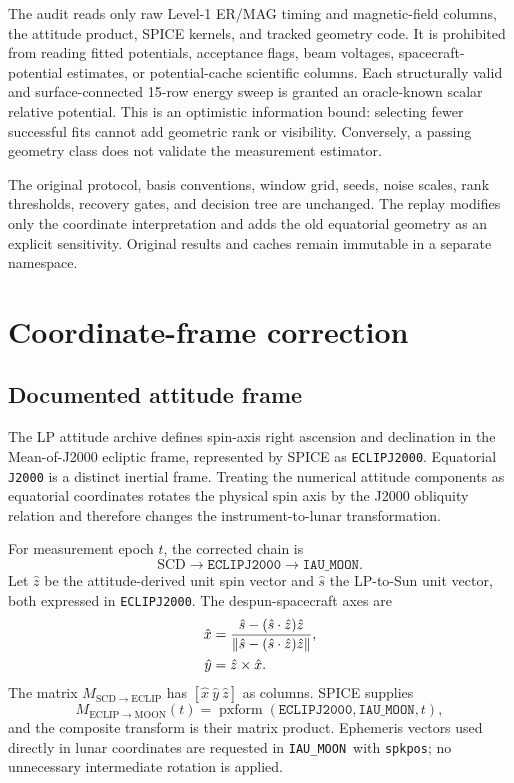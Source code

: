 \documentclass[11pt]{article}
\newcommand{\ECLIP}{\texttt{ECLIPJ2000}}
\newcommand{\MOON}{\texttt{IAU\_MOON}}
\begin{document}
The audit reads only raw Level-1 ER/MAG timing and magnetic-field columns, the
attitude product, SPICE kernels, and tracked geometry code.  It is prohibited
from reading fitted potentials, acceptance flags, beam voltages,
spacecraft-potential estimates, or potential-cache scientific columns.  Each
structurally valid and surface-connected 15-row energy sweep is granted an
oracle-known scalar relative potential.  This is an optimistic information
bound: selecting fewer successful fits cannot add geometric rank or
visibility.  Conversely, a passing geometry class does not validate the
measurement estimator.

The original protocol, basis conventions, window grid, seeds, noise scales,
rank thresholds, recovery gates, and decision tree are unchanged.  The replay
modifies only the coordinate interpretation and adds the old equatorial
geometry as an explicit sensitivity.  Original results and caches remain
immutable in a separate namespace.

\section{Coordinate-frame correction}

\subsection{Documented attitude frame}

The LP attitude archive defines spin-axis right ascension and declination in
the Mean-of-J2000 ecliptic frame, represented by SPICE as \ECLIP.  Equatorial
\texttt{J2000} is a distinct inertial frame.  Treating the numerical attitude
components as equatorial coordinates rotates the physical spin axis by the
J2000 obliquity relation and therefore changes the instrument-to-lunar
transformation.

For measurement epoch $t$, the corrected chain is
\begin{equation}
 \mathrm{SCD}\longrightarrow\ECLIP\longrightarrow\MOON.
\end{equation}
Let $\hat z$ be the attitude-derived unit spin vector and $\hat s$ the LP-to-Sun
unit vector, both expressed in \ECLIP.  The despun-spacecraft axes are
\begin{align}
 \hat x &={\hat s-(\hat s\cdot\hat z)\hat z \over
 \left\|\hat s-(\hat s\cdot\hat z)\hat z\right\|},\\
 \hat y &= \hat z\times\hat x.
\end{align}
The matrix $M_{\mathrm{SCD}\rightarrow\mathrm{ECLIP}}$ has
$[\hat x\ \hat y\ \hat z]$ as columns.  SPICE supplies
\begin{equation}
 M_{\mathrm{ECLIP}\rightarrow\mathrm{MOON}}(t)
 =\operatorname{pxform}(\ECLIP,\MOON,t),
\end{equation}
and the composite transform is their matrix product.  Ephemeris vectors used
directly in lunar coordinates are requested in \MOON\ with
\texttt{spkpos}; no unnecessary intermediate rotation is applied.
\end{document}
